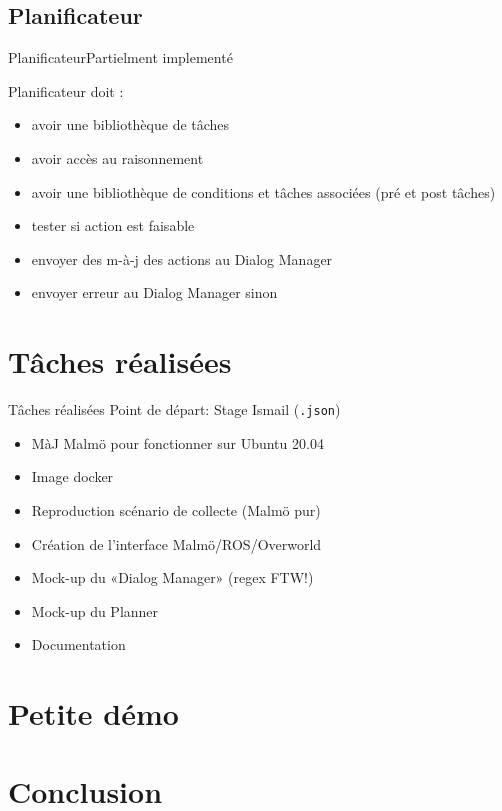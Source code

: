 \documentclass[aspectratio=169]{audition-beamer}
\begin{document}
\subsection{Planificateur}
\begin{frame}{Planificateur}{Partielment implementé }

  \pause
  Planificateur doit :
  \begin{itemize}[<+(1)->]
    \item[\only<8->{\checkmark}] avoir une bibliothèque de tâches
    \item[\only<8->{\checkmark}] avoir accès au raisonnement
    \item[] avoir une bibliothèque de conditions et tâches associées (pré et post tâches)
    \item[] tester si action est faisable
    \item[\only<8->{\checkmark}] envoyer des m-à-j des actions au Dialog Manager
    \item[\only<8->{\checkmark}] envoyer erreur au Dialog Manager sinon
  \end{itemize}
\end{frame}


\section{Tâches réalisées}
\begin{frame}{Tâches réalisées}
  \pause
  \vfill
Point de départ: Stage Ismail (\texttt{.json})
  \pause
  \vfill
\begin{itemize}[<+(1)->]
  \item MàJ Malmö pour fonctionner sur Ubuntu 20.04
  \item Image docker
  \item Reproduction scénario de collecte (Malmö pur)
  \item Création de l'interface Malmö/ROS/Overworld
  \item Mock-up du «Dialog Manager» (regex FTW!)
  \item Mock-up du Planner
  \item Documentation
\end{itemize}
\end{frame}

\section{Petite démo}

\section{Conclusion}
\end{document}
